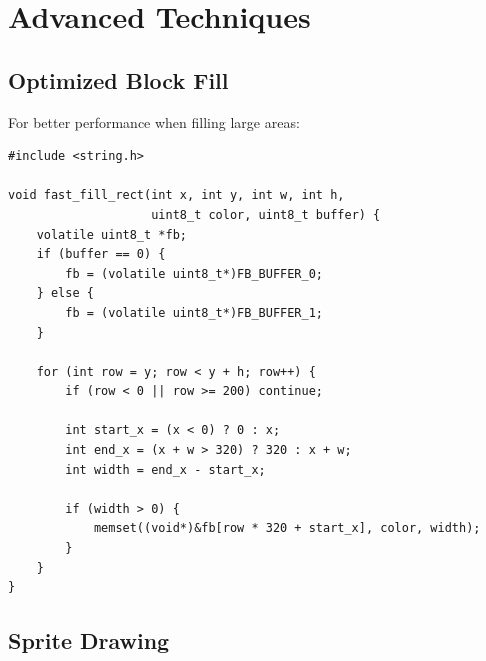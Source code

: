 \documentclass[11pt,letterpaper]{report}
\begin{document}
\section{Advanced Techniques}

\subsection{Optimized Block Fill}

For better performance when filling large areas:

\begin{lstlisting}[style=c,caption={Optimized Block Fill Using memset}]
#include <string.h>

void fast_fill_rect(int x, int y, int w, int h, 
                    uint8_t color, uint8_t buffer) {
    volatile uint8_t *fb;
    if (buffer == 0) {
        fb = (volatile uint8_t*)FB_BUFFER_0;
    } else {
        fb = (volatile uint8_t*)FB_BUFFER_1;
    }
    
    for (int row = y; row < y + h; row++) {
        if (row < 0 || row >= 200) continue;
        
        int start_x = (x < 0) ? 0 : x;
        int end_x = (x + w > 320) ? 320 : x + w;
        int width = end_x - start_x;
        
        if (width > 0) {
            memset((void*)&fb[row * 320 + start_x], color, width);
        }
    }
}
\end{lstlisting}

\subsection{Sprite Drawing}
\end{document}
